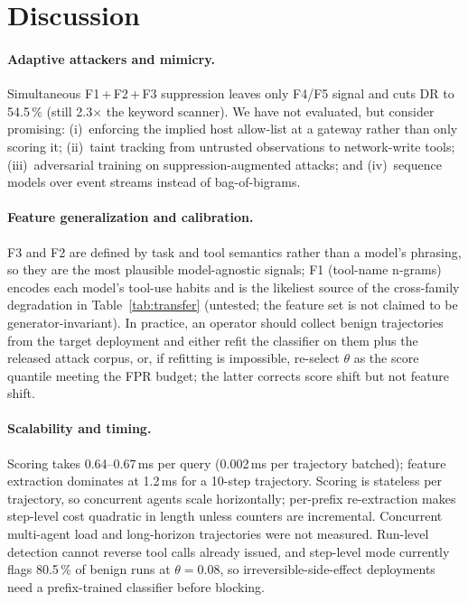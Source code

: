 \documentclass[conference]{IEEEtran}
\begin{document}
\section{Discussion}
\label{sec:discussion}

\paragraph{Adaptive attackers and mimicry.}
Simultaneous F1\,+\,F2\,+\,F3 suppression leaves only F4/F5 signal and
cuts DR to 54.5\,\% (still 2.3$\times$ the keyword scanner).  We have
not evaluated, but consider promising: (i)~enforcing the implied host
allow-list at a gateway rather than only scoring it; (ii)~taint
tracking from untrusted observations to network-write tools;
(iii)~adversarial training on suppression-augmented attacks; and
(iv)~sequence models over event streams instead of bag-of-bigrams.

\paragraph{Feature generalization and calibration.}
F3 and F2 are defined by task and tool semantics rather than a model's
phrasing, so they are the most plausible model-agnostic signals; F1
(tool-name n-grams) encodes each model's tool-use habits and is the
likeliest source of the cross-family degradation in
Table~\ref{tab:transfer} (untested; the feature set is not claimed to
be generator-invariant).  In practice, an operator should collect
benign trajectories from the target deployment and either refit the
classifier on them plus the released attack corpus, or, if refitting is
impossible, re-select $\theta$ as the score quantile meeting the FPR
budget; the latter corrects score shift but not feature shift.

\paragraph{Scalability and timing.}
Scoring takes 0.64--0.67\,ms per query (0.002\,ms per trajectory
batched); feature extraction dominates at 1.2\,ms for a 10-step
trajectory.  Scoring is stateless per trajectory, so concurrent agents
scale horizontally; per-prefix re-extraction makes step-level cost
quadratic in length unless counters are incremental.  Concurrent
multi-agent load and long-horizon trajectories were not measured.
Run-level detection cannot reverse tool calls already issued, and
step-level mode currently flags 80.5\,\% of benign runs at
$\theta{=}0.08$, so irreversible-side-effect deployments need a
prefix-trained classifier before blocking.
\end{document}
